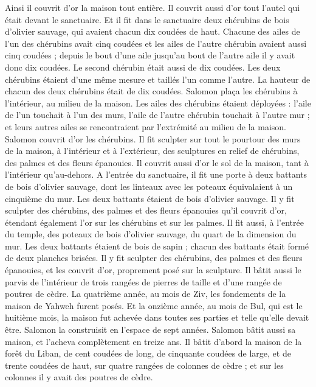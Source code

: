\begin{multicols}{2}
Ainsi il couvrit d'or la maison tout entière. Il couvrit aussi d'or tout l'autel qui était devant le sanctuaire.
Et il fit dans le sanctuaire deux chérubins de bois d'olivier sauvage, qui avaient chacun dix coudées de haut.
Chacune des ailes de l'un des chérubins avait cinq coudées et les ailes de l’autre chérubin avaient aussi cinq coudées ; depuis le bout d'une aile jusqu'au bout de l'autre aile il y avait donc dix coudées.
Le second chérubin était aussi de dix coudées. Les deux chérubins étaient d'une même mesure et taillés l'un comme l'autre.
La hauteur de chacun des deux chérubins était de dix coudées.
Salomon plaça les chérubins à l’intérieur, au milieu de la maison. Les ailes des chérubins étaient déployées : l'aile de l'un touchait à l’un des murs, l'aile de l'autre chérubin touchait à l'autre mur ; et leurs autres ailes se rencontraient par l’extrémité au milieu de la maison.
Salomon couvrit d'or les chérubins.
Il fit sculpter sur tout le pourtour des murs de la maison, à l’intérieur et à l’extérieur, des sculptures en relief de chérubins, des palmes et des fleurs épanouies.
Il couvrit aussi d'or le sol de la maison, tant à l’intérieur qu’au-dehors.
A l'entrée du sanctuaire, il fit une porte à deux battants de bois d'olivier sauvage, dont les linteaux avec les poteaux équivalaient à un cinquième du mur.
Les deux battants étaient de bois d'olivier sauvage. Il y fit sculpter des chérubins, des palmes et des fleurs épanouies qu’il couvrit d'or, étendant également l'or sur les chérubins et sur les palmes.
Il fit aussi, à l'entrée du temple, des poteaux de bois d'olivier sauvage, du quart de la dimension du mur.
Les deux battants étaient de bois de sapin ; chacun des battants était formé de deux planches brisées.
Il y fit sculpter des chérubins, des palmes et des fleurs épanouies, et les couvrit d'or, proprement posé sur la sculpture.
Il bâtit aussi le parvis de l’intérieur de trois rangées de pierres de taille et d'une rangée de poutres de cèdre.
La quatrième année, au mois de Ziv, les fondements de la maison de Yahweh furent posés.
Et la onzième année, au mois de Bul, qui est le huitième mois, la maison fut achevée dans toutes ses parties et telle qu’elle devait être. Salomon la construisit en l’espace de sept années.
\VerseOne{}Salomon bâtit aussi sa maison, et l'acheva complètement en treize ans.
Il bâtit d’abord la maison de la forêt du Liban, de cent coudées de long, de cinquante coudées de large, et de trente coudées de haut, sur quatre rangées de colonnes de cèdre ; et sur les colonnes il y avait des poutres de cèdre.

\end{multicols}
